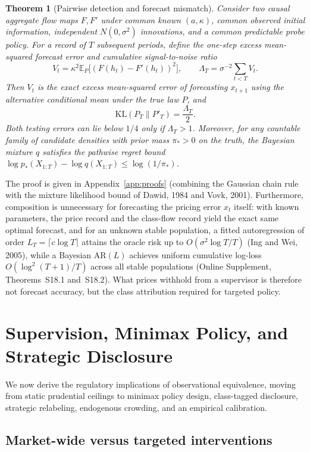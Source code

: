 \documentclass[11pt,letterpaper]{article}
\newtheorem{theorem}{Theorem}[section]
\theoremstyle{definition}
\newcommand{\E}{\mathbb{E}}
\newcommand{\KL}{\mathrm{KL}}
\begin{document}
\begin{theorem}[Pairwise detection and forecast mismatch]\label{thm:forecast-kl}
Consider two causal aggregate flow maps $F, F'$ under common known $(a, \kappa)$, common observed initial information, independent $N(0, \sigma^2)$ innovations, and a common predictable probe policy. For a record of $T$ subsequent periods, define the one-step excess mean-squared forecast error and cumulative signal-to-noise ratio
\[
  V_t = \kappa^2 \E_P\bigl[(F(h_t) - F'(h_t))^2\bigr], \qquad \Lambda_T = \sigma^{-2} \sum_{t < T} V_t.
\]
Then $V_t$ is the exact excess mean-squared error of forecasting $x_{t+1}$ using the alternative conditional mean under the true law $P$, and
\[
  \KL(P_T \| P'_T) = \frac{\Lambda_T}{2}.
\]
Both testing errors can lie below $1/4$ only if $\Lambda_T > 1$. Moreover, for any countable family of candidate densities with prior mass $\pi_* > 0$ on the truth, the Bayesian mixture $q$ satisfies the pathwise regret bound $\log p_*(X_{1:T}) - \log q(X_{1:T}) \le \log(1/\pi_*)$.
\end{theorem}

The proof is given in Appendix~\ref{app:proofs} (combining the Gaussian chain rule with the mixture likelihood bound of Dawid, 1984 and Vovk, 2001). Furthermore, composition is unnecessary for forecasting the pricing error $x_t$ itself: with known parameters, the price record and the class-flow record yield the exact same optimal forecast, and for an unknown stable population, a fitted autoregression of order $L_T = \lceil c \log T \rceil$ attains the oracle risk up to $O(\sigma^2 \log T / T)$ (Ing and Wei, 2005), while a Bayesian $\mathrm{AR}(L)$ achieves uniform cumulative log-loss $O(\log^2(T+1)/T)$ across all stable populations (Online Supplement, Theorems~S18.1 and~S18.2). What prices withhold from a supervisor is therefore not forecast accuracy, but the class attribution required for targeted policy.

\section{Supervision, Minimax Policy, and Strategic Disclosure}\label{sec:supervision}

We now derive the regulatory implications of observational equivalence, moving from static prudential ceilings to minimax policy design, class-tagged disclosure, strategic relabeling, endogenous crowding, and an empirical calibration.

\subsection{Market-wide versus targeted interventions}
\end{document}
